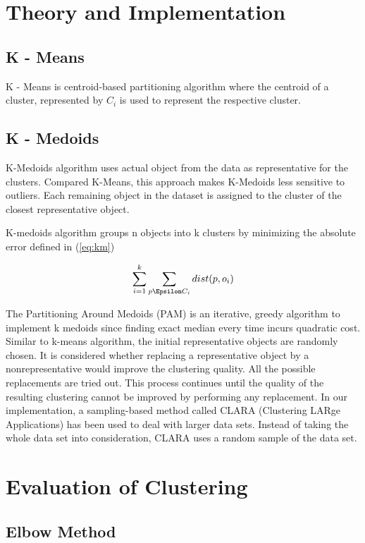 \documentclass[12pt]{article}
\begin{document}
\section{Theory and Implementation}
\subsection{K - Means}
K - Means is centroid-based partitioning algorithm where the centroid of a cluster, represented by $C_i$ is used to represent the respective cluster.

\subsection{K - Medoids}
K-Medoids algorithm uses actual object from the data as representative for the clusters. Compared K-Means, this approach makes K-Medoids less sensitive to outliers. Each remaining object in the dataset is assigned to the cluster of the closest representative object.

K-medoids algorithm groups n objects into k clusters by minimizing the absolute error defined in (\ref{eq:km})

\begin{equation}
\label{eq:km}
 \sum_{i=1}^{k}\sum_{p \Epsilon C_i} dist(p,o_i)
\end{equation}

The Partitioning Around Medoids (PAM) is an iterative, greedy
algorithm to implement k medoids since finding exact median every time incurs quadratic cost. Similar to k-means algorithm, the initial representative objects are randomly
chosen. It is considered whether replacing a representative object by a nonrepresentative
 would improve the clustering quality. All the possible replacements
are tried out. This process continues until the quality of the resulting clustering cannot be improved by performing any replacement. In our implementation,  a sampling-based method called CLARA (Clustering LARge Applications) has been used to deal with larger data sets. Instead of taking the whole data set into consideration, CLARA uses a random sample of the data set.

\section{Evaluation of Clustering}

\subsection{Elbow Method}
\end{document}
